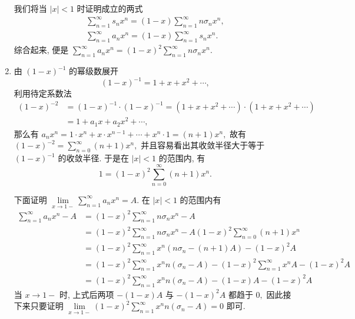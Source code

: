 \begin{solution}
\begin{enumerate}
    我们将当 $\lvert x \rvert < 1$ 时证明成立的两式
    \begin{gather*}
      \sum\limits_{n=1}^{\infty} s_n x^n = (1-x) \sum\limits_{n=1}^{\infty} n\sigma_n x^n, \\
      \sum\limits_{n=1}^{\infty} a_n x^n = (1 - x) \sum\limits_{n=1}^{\infty} s_n x^n.
    \end{gather*}
    综合起来, 便是 $\sum\limits_{n=1}^{\infty} a_n x^n = (1-x)^2 \sum\limits_{n=1}^{\infty} n\sigma_n x^n.$
    \item 由 $(1-x)^{-1}$ 的幂级数展开
    $$(1-x)^{-1} = 1 + x + x^2 + \cdots,$$
    利用待定系数法
    \begin{align*}
      (1-x)^{-2} & = (1-x)^{-1} \cdot (1-x)^{-1} = (1 + x + x^2 + \cdots) \cdot (1 + x + x^2 + \cdots) \\
      & = 1 + a_1x + a_2x^2 + \cdots,
    \end{align*}
    那么有 $a_nx^n = 1\cdot x^n + x\cdot x^{n-1} + \cdots + x^n\cdot 1 = (n+1) x^n,$
    故有 $(1-x)^{-2} = \sum\limits_{n=0}^\infty (n+1) x^n,$ 并且容易看出其收敛半径大于等于 $(1-x)^{-1}$ 的收敛半径. 于是在 $\lvert x \rvert < 1$ 的范围内, 有
    $$1 = (1-x)^2 \sum\limits_{n=0}^\infty (n+1) x^n.$$

    下面证明 $\lim\limits_{x \to 1-} \sum\limits_{n=1}^{\infty} a_n x^n = A.$ 在 $\lvert x \rvert < 1$ 的范围内有
    \begin{align*}
      \sum\limits_{n=1}^{\infty} a_n x^n - A & = (1-x)^2 \sum\limits_{n=1}^{\infty} n\sigma_n x^n - A \\
      & = (1-x)^2 \sum\limits_{n=1}^{\infty} n\sigma_n x^n - A (1-x)^2 \sum\limits_{n=0}^\infty (n+1) x^n \\
      & = (1-x)^2 \sum\limits_{n=1}^\infty x^n (n \sigma_n - (n+1)A) - (1-x)^2 A \\
      & = (1-x)^2 \sum\limits_{n=1}^\infty x^n n (\sigma_n - A) - (1-x)^2 \sum\limits_{n=1}^\infty x^n A - (1-x)^2 A \\
      & = (1-x)^2 \sum\limits_{n=1}^\infty x^n n (\sigma_n - A) - (1 - x) A - (1-x)^2 A
    \end{align*}
    当 $x \to 1-$ 时, 上式后两项 $-(1 - x) A$ 与 $-(1-x)^2 A$ 都趋于 $0,$ 因此接下来只要证明 $\lim\limits_{x \to 1-} (1-x)^2 \sum\limits_{n=1}^\infty x^n n (\sigma_n - A) = 0$ 即可.


\end{enumerate}
\end{solution}
